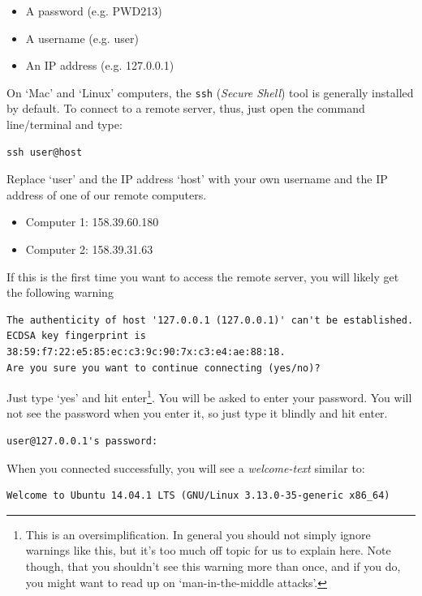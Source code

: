 \documentclass[11pt]{article}
\begin{document}
\begin{itemize}
\item A password (e.g. PWD213)
\item A username (e.g. user)
\item An IP address (e.g. 127.0.0.1)
\end{itemize}

On `Mac' and `Linux' computers, the \texttt{ssh} (\emph{Secure Shell}) tool is
generally installed by default. To connect to a remote server, thus,
just open the command line/terminal and type:


\begin{verbatim}
ssh user@host
\end{verbatim}


Replace `user' and the IP address `host' with your own
username and the IP address of one of our remote computers.
\begin{itemize}
\item Computer 1: 158.39.60.180
\item Computer 2: 158.39.31.63
\end{itemize}

If this is the first time you want to access the remote server, you
will likely get the following warning


\begin{verbatim}
The authenticity of host '127.0.0.1 (127.0.0.1)' can't be established.
ECDSA key fingerprint is 38:59:f7:22:e5:85:ec:c3:9c:90:7x:c3:e4:ae:88:18.
Are you sure you want to continue connecting (yes/no)?
\end{verbatim}

Just type `yes' and hit enter\footnote{This is an oversimplification. In general you should not simply
ignore warnings like this, but it's too much off topic for us to
explain here. Note though, that you shouldn't see this warning more than once,
and if you do, you might want to read up on `man-in-the-middle attacks'.
 }. You will be asked to enter your
password. You will not see the password when you enter it, so just
type it blindly and hit enter.


\begin{verbatim}
user@127.0.0.1's password:
\end{verbatim}

When you connected successfully, you will see a \emph{welcome-text} similar to:


\begin{verbatim}
Welcome to Ubuntu 14.04.1 LTS (GNU/Linux 3.13.0-35-generic x86_64)
\end{verbatim}
\end{document}
